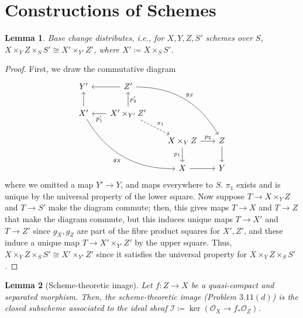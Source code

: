 \documentclass[12pt,letterpaper]{article}
\newtheorem{lemma}{Lemma}[section]
\theoremstyle{definition}
\theoremstyle{remark}
\numberwithin{equation}{section}
\numberwithin{figure}{problem}
\newcommand{\II}{\mathscr{I}}
\newcommand{\OO}{\mathcal{O}}
\begin{document}
\section{Constructions of Schemes}
\begin{lemma}\label{basechangedist}
  Base change distributes, i.e., for $X,Y,Z,S'$ schemes over $S$, $X \times_Y Z \times_S S' \cong X' \times_{Y'} Z'$, where $X' \coloneqq X \times_S S'$.
\end{lemma}
\begin{proof}
  First, we draw the commutative diagram
  \begin{equation}\label{bcdistdiag}
    \begin{tikzcd}[column sep=scriptsize]
      Y' & \arrow{l} Z'\arrow[bend left]{ddrr}{g_Z}\\
      X'\arrow[bend right]{ddrr}[swap]{g_X}\uar & \arrow{l}{p_1'}X' \times_{Y'} Z'\uar[swap]{p_2'}\arrow[dashed]{dr}{\pi_1}\\
      && X \times_Y Z\dar[swap]{p_1} \rar{p_2} & Z\dar\\
      && X \rar & Y
    \end{tikzcd}
  \end{equation}
  where we omitted a map $Y' \to Y$, and maps everywhere to $S$. $\pi_1$ exists and is unique by the universal property of the lower square. Now suppose $T \to X \times_Y Z$ and $T \to S'$ make the diagram commute; then, this gives maps $T \to X$ and $T \to Z$ that make the diagram commute, but this induces unique maps $T \to X'$ and $T \to Z'$ since $g_X,g_Z$ are part of the fibre product squares for $X',Z'$, and these induce a unique map $T \to X' \times_{Y'} Z'$ by the upper square. Thus, $X \times_Y Z \times_S S' \cong X' \times_{Y'} Z'$ since it satisfies the universal property for $X \times_Y Z \times_S S'$.
\end{proof}
\begin{lemma}[Scheme-theoretic image]\label{stimg}
  Let $f \colon Z \to X$ be a quasi-compact and separated morphism. Then, the scheme-theoretic image \emph{(Problem $3.11(d)$)} is the closed subscheme associated to the ideal sheaf $\II \coloneqq \ker(\OO_X \to f_*\OO_Z)$.
\end{lemma}
\end{document}
